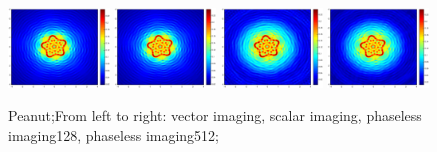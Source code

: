 \documentclass[12pt]{iopart}
\begin{document}
\begin{figure}
	\centering
	\includegraphics[width=0.24\textwidth]{./graphic_phase/5-leaf_r_10_k_4_vector.eps}
	\includegraphics[width=0.24\textwidth]{./graphic_phase/5-leaf_r_10_k_4_scalar.eps}
	\includegraphics[width=0.24\textwidth]{./graphic_phase/5-leaf_r_10_k_4_phaseless_n_128_bias_100.eps}
	\includegraphics[width=0.24\textwidth]{./graphic_phase/5-leaf_r_10_k_4_phaseless_n_512_bias_100.eps}
	\caption{Peanut;From left to right: vector imaging, scalar imaging, phaseless imaging128, phaseless imaging512;  }\label{figure_5-leaf_phaless}
\end{figure}
\end{document}
